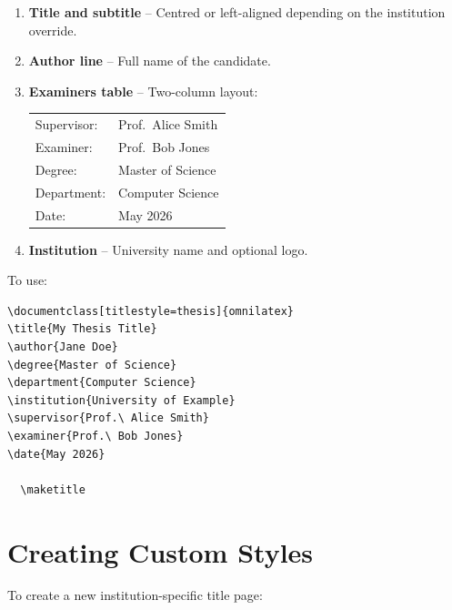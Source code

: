 \begin{enumerate}
  \item \textbf{Title and subtitle} -- Centred or left-aligned depending
        on the institution override.
  \item \textbf{Author line} -- Full name of the candidate.
  \item \textbf{Examiners table} -- Two-column layout:
        \begin{tabularx}{0.9\linewidth}{l l}
          Supervisor:  & Prof.\ Alice Smith \\
          Examiner:    & Prof.\ Bob Jones \\
          Degree:      & Master of Science \\
          Department:  & Computer Science \\
          Date:        & May 2026 \\
        \end{tabularx}
  \item \textbf{Institution} -- University name and optional logo.
\end{enumerate}

To use:

\begin{verbatim}
\documentclass[titlestyle=thesis]{omnilatex}
\title{My Thesis Title}
\author{Jane Doe}
\degree{Master of Science}
\department{Computer Science}
\institution{University of Example}
\supervisor{Prof.\ Alice Smith}
\examiner{Prof.\ Bob Jones}
\date{May 2026}

  \maketitle

\end{verbatim}

\section{Creating Custom Styles}

To create a new institution-specific title page:

